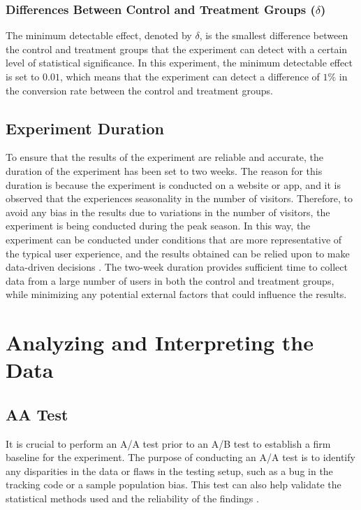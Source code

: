 \documentclass{article}
\begin{document}
\subsubsection*{Differences Between Control and Treatment Groups ($\delta$)} 

The minimum detectable effect, denoted by $\delta$, is the smallest difference between the control and treatment groups that the experiment can detect with a certain level of statistical significance. In this experiment, the minimum detectable effect is set to $0.01$, which means that the experiment can detect a difference of $1\%$ in the conversion rate between the control and treatment groups. 

\subsection*{Experiment Duration} 

To ensure that the results of the experiment are reliable and accurate, the duration of the experiment has been set to two weeks. The reason for this duration is because the experiment is conducted on a website or app, and it is observed that the experiences seasonality in the number of visitors. Therefore, to avoid any bias in the results due to variations in the number of visitors, the experiment is being conducted during the peak season. In this way, the experiment can be conducted under conditions that are more representative of the typical user experience, and the results obtained can be relied upon to make data-driven decisions \cite{saleh_2017_how}. The two-week duration provides sufficient time to collect data from a large number of users in both the control and treatment groups, while minimizing any potential external factors that could influence the results.


\section{Analyzing and Interpreting the Data}
\subsection{AA Test}

It is crucial to perform an A/A test prior to an A/B test to establish a firm baseline for the experiment. The purpose of conducting an A/A test is to identify any disparities in the data or flaws in the testing setup, such as a bug in the tracking code or a sample population bias. This test can also help validate the statistical methods used and the reliability of the findings \cite{makkar_2019}.
\end{document}
